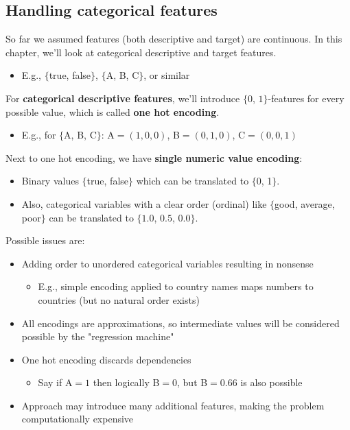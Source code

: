 \subsection{Handling categorical features}

So far we assumed features (both descriptive and target) are continuous. In this chapter, we'll look at categorical descriptive and target features.
\begin{note}
  \begin{itemize}
    \item E.g., $\{$true, false$\}$, $\{$A, B, C$\}$, or similar
  \end{itemize}
\end{note}

For \textbf{categorical descriptive features}, we'll introduce $\{0$, $1\}$-features for every possible value, which is called \textbf{one hot encoding}.
\begin{note}
  \begin{itemize}
    \item E.g., for $\{$A, B, C$\}$: A$=(1,0,0)$, B$=(0,1,0)$, C$=(0,0,1)$
  \end{itemize}
\end{note}

Next to one hot encoding, we have \textbf{single numeric value encoding}:
\begin{itemize}
  \item Binary values $\{$true, false$\}$ which can be translated to $\{$0, 1$\}$.
  \item Also, categorical variables with a clear order (ordinal) like $\{$good, average, poor$\}$ can be translated to $\{$$1.0$, $0.5$, $0.0$$\}$.
\end{itemize}

Possible issues are:
\begin{itemize}
  \item Adding order to unordered categorical variables resulting in nonsense
  \begin{note}
    \begin{itemize}
      \item E.g., simple encoding applied to country names maps numbers to countries (but no natural order exists)
    \end{itemize}
  \end{note}
  \item All encodings are approximations, so intermediate values will be considered possible by the "regression machine"
  \item One hot encoding discards dependencies
  \begin{itemize}
    \item Say if A$=1$ then logically B$=0$, but B$=0.66$ is also possible
  \end{itemize}
  \item Approach may introduce many additional features, making the problem computationally expensive
\end{itemize}

